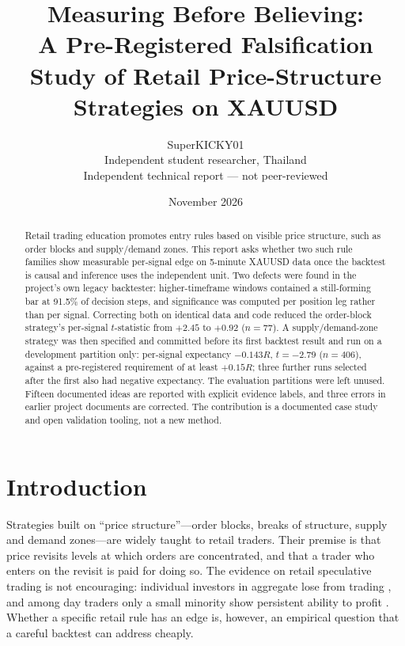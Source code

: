 \documentclass[11pt,a4paper]{article}
\title{Measuring Before Believing:\\[2pt]
\large A Pre-Registered Falsification Study of Retail Price-Structure Strategies on XAUUSD}
\author{SuperKICKY01\\\small Independent student researcher, Thailand\\\small Independent technical report --- not peer-reviewed}
\date{November 2026}
\newcommand{\R}{\ensuremath{R}}
\begin{document}
\maketitle

\begin{abstract}
\noindent
Retail trading education promotes entry rules based on visible price structure, such as order
blocks and supply/demand zones. This report asks whether two such rule families show measurable
per-signal edge on 5-minute XAUUSD data once the backtest is causal and inference uses the
independent unit. Two defects were found in the project's own legacy backtester:
higher-timeframe windows contained a still-forming bar at 91.5\% of decision steps, and
significance was computed per position leg rather than per signal. Correcting both on identical
data and code reduced the order-block strategy's per-signal $t$-statistic from $+2.45$ to $+0.92$
($n=77$). A supply/demand-zone strategy was then specified and committed before its first backtest result
and run on a development partition only: per-signal expectancy $-0.143\R$, $t=-2.79$ ($n=406$),
against a pre-registered requirement of at least $+0.15\R$; three further runs selected after the
first also had negative expectancy. The evaluation partitions were left unused. Fifteen
documented ideas are reported with explicit evidence labels, and three errors in earlier project
documents are corrected. The contribution is a documented case study and open validation
tooling, not a new method.
\end{abstract}

\section{Introduction}

Strategies built on ``price structure''---order blocks, breaks of structure, supply and demand
zones---are widely taught to retail traders. Their premise is that price revisits levels at
which orders are concentrated, and that a trader who enters on the revisit is paid for doing so.
The evidence on retail speculative trading is not encouraging: individual investors in aggregate
lose from trading \citep{barber2009lose}, and among day traders only a small minority show
persistent ability to profit \citep{barber2014daytrading}. Whether a specific retail rule has an
edge is, however, an empirical question that a careful backtest can address cheaply.
\end{document}
